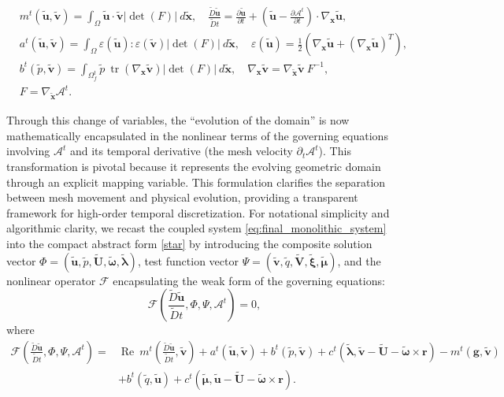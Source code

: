 \documentclass{article}
\newcommand{\bU}{{\mathbf{U}}}
\newcommand{\bx}{{\mathbf{x}}}
\newcommand{\bv}{{\mathbf{v}}}
\newcommand{\br}{{\mathbf{r}}}
\newcommand{\tr}{{\operatorname{tr}}}
\newcommand{\Reynolds}{{\operatorname{Re}}}
\newcommand\tu{{\tilde{\mathbf{u}}}}
\newcommand\tU{{\tilde{\mathbf{U}}}}
\newcommand\tp{{\tilde{{p}}}}
\newcommand\tomega{{\tilde{\boldsymbol{\omega}}}}
\begin{document}
\begin{equation*}
    \begin{aligned}
        & {m}^t(\tu, \tilde{\bv}) = \int_{\Omega} \tu\cdot\tilde{\bv}|\det(F)| \ d\tilde{\bx},\quad
        \frac{\tilde{D}\tu}{\tilde{D}t} = \frac{\partial\tu}{\partial t} + (\tu - \frac{\partial \mathcal{A}^t}{\partial t})\cdot \nabla_{\bx}\tu,\\
        &{a}^t(\tu,\tilde{\bv}) = \int_{\Omega} \varepsilon(\tu):\varepsilon(\tilde{\bv})|\det(F)| \ d\tilde{\bx},
        \quad\varepsilon(\tu) = \frac{1}{2}(\nabla_{\bx}\tu + (\nabla_{\bx}\tu)^T),\\
        &{b}^t(\tp, \tilde{\bv}) = \int_{\Omega_f^t} \tp\ \tr(\nabla_{\bx}\tilde{\bv})|\det(F)| \ d\tilde{\bx},\quad \nabla_{\bx}\tilde{\bv} = \nabla_{\tilde{\bx}} \tilde{\bv}\ F^{-1},\\
        &F = \nabla_{\tilde{\bx}} \mathcal{A}^t.
    \end{aligned}
\end{equation*}


Through this change of variables, the ``evolution of the domain'' is now mathematically encapsulated in the nonlinear terms of the governing equations involving $\mathcal{A}^t$ and its temporal derivative (the mesh velocity $\partial_t \mathcal{A}^t$). This transformation is pivotal because it represents the evolving geometric domain through an explicit mapping variable. This formulation clarifies the separation between mesh movement and physical evolution, providing a transparent framework for high-order temporal discretization.
For notational simplicity and algorithmic clarity, we recast the coupled system \eqref{eq:final_monolithic_system} into the compact abstract form \eqref{star} by introducing the composite solution vector $\Phi = (\tu, \tp, \tilde{\bU}, \tilde{\boldsymbol{\omega}}, \tilde{\boldsymbol{\lambda}})$, test function vector $\Psi = (\tilde{\bv},\tilde{q},\tilde{\mathbf{V}} , \tilde{\boldsymbol{\xi}}, \tilde{\boldsymbol{\mu}})$, and the nonlinear operator $\mathcal{F}$ encapsulating the weak form of the governing equations:
\begin{equation}\label{star}
    \mathcal{F}(\frac{\tilde{D}\tu}{\tilde{D}t},\Phi, \Psi,\mathcal{A}^t)=0,
\end{equation}
where 
\begin{equation}\label{eq:Full_form_ALE}
    \begin{aligned}
        \mathcal{F}(\frac{\tilde{D}\tu}{\tilde{D}t},\Phi, \Psi,\mathcal{A}^t) =
        &\Reynolds ~{m}^t(\frac{\tilde{D}\tu}{\tilde{D}t}, \tilde{\bv}) + {a}^t(\tu,\tilde{\bv}) + {b}^t(\tp,\tilde{\bv}) + c^t(\tilde{\boldsymbol{\lambda}}, \tilde{\bv} - \tU - \tomega \times \br) - {m}^t(\mathbf{g},\tilde{\bv})\\
        &+ {b}^t(\tilde{q}, \tu) + c^t(\tilde{\boldsymbol{\mu}}, \tu - \tU - \tomega \times \br).
    \end{aligned}
\end{equation}
\end{document}

